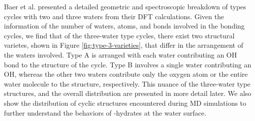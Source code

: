 Baer et al. presented a detailed geometric and spectroscopic breakdown of types  cycles with two and three waters from their DFT calculations.\cite{Baer2010} Given the information of the number of waters, atoms, and bonds involved in the bonding cycles, we find that of the three-water type  cycles, there exist two structural varietes, shown in Figure \ref{fig:type-3-varieties}, that differ in the arrangement of the waters involved. Type A is arranged with each water contributing an OH bond to the structure of the cycle. Type B involves a single water contributing an OH, whereas the other two waters contribute only the oxygen atom or the entire water molecule to the structure, respectively. This nuance of the three-water type  structures, and the overall distribution are presented in more detail later. We also show the distribution of cyclic structures encountered during MD simulations to further understand the behaviors of \suldiox-hydrates at the water surface.


